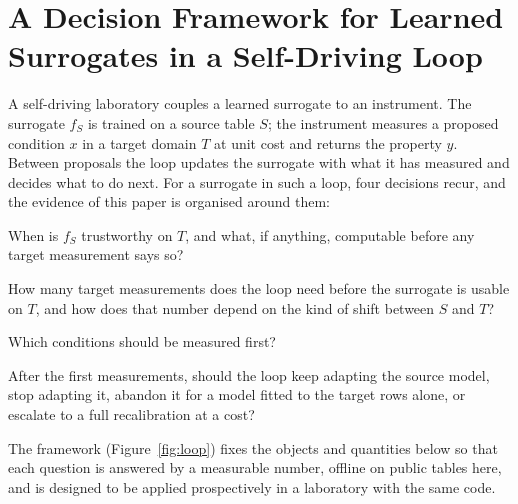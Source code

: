 \documentclass[11pt,a4paper]{article}
\begin{document}
\section{A Decision Framework for Learned Surrogates in a Self-Driving Loop}
\label{sec:framework}

A self-driving laboratory couples a learned surrogate to an instrument. The
surrogate $f_S$ is trained on a source table $S$; the instrument measures a
proposed condition $x$ in a target domain $T$ at unit cost and returns the
property $y$. Between proposals the loop updates the surrogate with what it
has measured and decides what to do next. For a surrogate in such a loop, four
decisions recur, and the evidence of this paper is organised around them:
\begin{description}[leftmargin=*,itemsep=1pt]
\item[Q1 Competence.] When is $f_S$ trustworthy on $T$, and what, if
  anything, computable before any target measurement says so?
\item[Q2 Budget.] How many target measurements does the loop need before the
  surrogate is usable on $T$, and how does that number depend on the kind of
  shift between $S$ and $T$?
\item[Q3 Acquisition.] Which conditions should be measured first?
\item[Q4 Decision.] After the first measurements, should the loop keep
  adapting the source model, stop adapting it, abandon it for a model fitted
  to the target rows alone, or escalate to a full recalibration at a cost?
\end{description}
The framework (Figure~\ref{fig:loop}) fixes the objects and quantities below so that each question is
answered by a measurable number, offline on public tables here, and is
designed to be applied prospectively in a laboratory with the same code.
\end{document}
